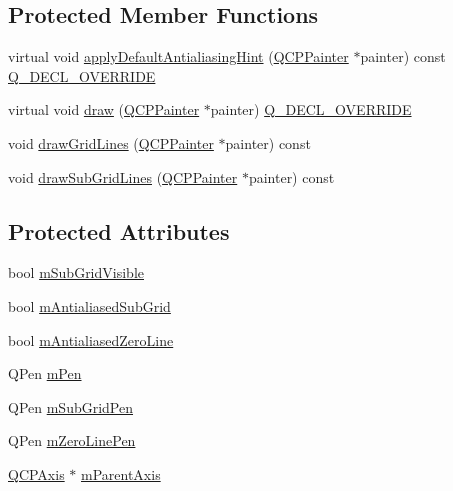 \subsection*{Protected Member Functions}
\begin{DoxyCompactItemize}
\item 
virtual void \mbox{\hyperlink{class_q_c_p_grid_a64fa48e16b4629f5df2a5029ab6e761c}{apply\+Default\+Antialiasing\+Hint}} (\mbox{\hyperlink{class_q_c_p_painter}{Q\+C\+P\+Painter}} $\ast$painter) const \mbox{\hyperlink{qcustomplot_8h_a42cc5eaeb25b85f8b52d2a4b94c56f55}{Q\+\_\+\+D\+E\+C\+L\+\_\+\+O\+V\+E\+R\+R\+I\+DE}}
\item 
virtual void \mbox{\hyperlink{class_q_c_p_grid_aad9a312d998e2d170956334d4cb80be2}{draw}} (\mbox{\hyperlink{class_q_c_p_painter}{Q\+C\+P\+Painter}} $\ast$painter) \mbox{\hyperlink{qcustomplot_8h_a42cc5eaeb25b85f8b52d2a4b94c56f55}{Q\+\_\+\+D\+E\+C\+L\+\_\+\+O\+V\+E\+R\+R\+I\+DE}}
\item 
void \mbox{\hyperlink{class_q_c_p_grid_aee4e95d54acabbe298d6dda0dd86c0a4}{draw\+Grid\+Lines}} (\mbox{\hyperlink{class_q_c_p_painter}{Q\+C\+P\+Painter}} $\ast$painter) const
\item 
void \mbox{\hyperlink{class_q_c_p_grid_a751ce8aef815bcc9193432a30c8b6b6e}{draw\+Sub\+Grid\+Lines}} (\mbox{\hyperlink{class_q_c_p_painter}{Q\+C\+P\+Painter}} $\ast$painter) const
\end{DoxyCompactItemize}
\subsection*{Protected Attributes}
\begin{DoxyCompactItemize}
\item 
bool \mbox{\hyperlink{class_q_c_p_grid_a4e4a0400d6319bb44c06341f6298c87b}{m\+Sub\+Grid\+Visible}}
\item 
bool \mbox{\hyperlink{class_q_c_p_grid_a71b7051f833f0c5de3094998d6afdd87}{m\+Antialiased\+Sub\+Grid}}
\item 
bool \mbox{\hyperlink{class_q_c_p_grid_a8c0df56ae86440408c050895dcdb922b}{m\+Antialiased\+Zero\+Line}}
\item 
Q\+Pen \mbox{\hyperlink{class_q_c_p_grid_a1cdc4a3bccf6a40c2d4360def9fefa40}{m\+Pen}}
\item 
Q\+Pen \mbox{\hyperlink{class_q_c_p_grid_aa9004bc139ad3ea92629f0aaae81d83f}{m\+Sub\+Grid\+Pen}}
\item 
Q\+Pen \mbox{\hyperlink{class_q_c_p_grid_a379481871f17655c27eda30af233554f}{m\+Zero\+Line\+Pen}}
\item 
\mbox{\hyperlink{class_q_c_p_axis}{Q\+C\+P\+Axis}} $\ast$ \mbox{\hyperlink{class_q_c_p_grid_a9a8a76731e6e737b65b929fd1995cc88}{m\+Parent\+Axis}}
\end{DoxyCompactItemize}
